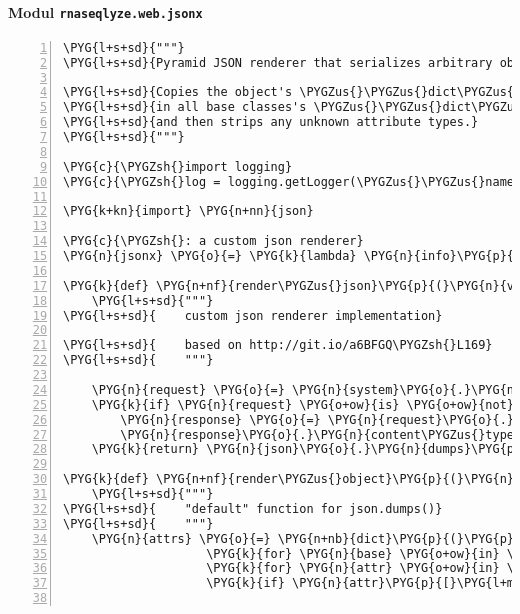 \paragraph{Modul \texttt{rnaseqlyze.web.jsonx}}
\label{rnaseqlyze-pdf:modul-rnaseqlyze-web-jsonx}
\begin{Verbatim}[commandchars=\\\{\},numbers=left,firstnumber=1,stepnumber=5]
\PYG{l+s+sd}{"""}
\PYG{l+s+sd}{Pyramid JSON renderer that serializes arbitrary objects}

\PYG{l+s+sd}{Copies the object's \PYGZus{}\PYGZus{}dict\PYGZus{}\PYGZus{}, looks up all attrs}
\PYG{l+s+sd}{in all base classes's \PYGZus{}\PYGZus{}dict\PYGZus{}\PYGZus{}'s on the object}
\PYG{l+s+sd}{and then strips any unknown attribute types.}
\PYG{l+s+sd}{"""}

\PYG{c}{\PYGZsh{}import logging}
\PYG{c}{\PYGZsh{}log = logging.getLogger(\PYGZus{}\PYGZus{}name\PYGZus{}\PYGZus{})}

\PYG{k+kn}{import} \PYG{n+nn}{json}

\PYG{c}{\PYGZsh{}: a custom json renderer}
\PYG{n}{jsonx} \PYG{o}{=} \PYG{k}{lambda} \PYG{n}{info}\PYG{p}{:} \PYG{n}{render\PYGZus{}json}

\PYG{k}{def} \PYG{n+nf}{render\PYGZus{}json}\PYG{p}{(}\PYG{n}{value}\PYG{p}{,} \PYG{n}{system}\PYG{p}{)}\PYG{p}{:}
    \PYG{l+s+sd}{"""}
\PYG{l+s+sd}{    custom json renderer implementation}

\PYG{l+s+sd}{    based on http://git.io/a6BFGQ\PYGZsh{}L169}
\PYG{l+s+sd}{    """}

    \PYG{n}{request} \PYG{o}{=} \PYG{n}{system}\PYG{o}{.}\PYG{n}{get}\PYG{p}{(}\PYG{l+s}{'}\PYG{l+s}{request}\PYG{l+s}{'}\PYG{p}{)}
    \PYG{k}{if} \PYG{n}{request} \PYG{o+ow}{is} \PYG{o+ow}{not} \PYG{n+nb+bp}{None}\PYG{p}{:}
        \PYG{n}{response} \PYG{o}{=} \PYG{n}{request}\PYG{o}{.}\PYG{n}{response}
        \PYG{n}{response}\PYG{o}{.}\PYG{n}{content\PYGZus{}type} \PYG{o}{=} \PYG{l+s}{'}\PYG{l+s}{application/json}\PYG{l+s}{'}
    \PYG{k}{return} \PYG{n}{json}\PYG{o}{.}\PYG{n}{dumps}\PYG{p}{(}\PYG{n}{value}\PYG{p}{,} \PYG{n}{default}\PYG{o}{=}\PYG{n}{render\PYGZus{}object}\PYG{p}{,} \PYG{n}{indent}\PYG{o}{=}\PYG{l+m+mi}{4}\PYG{p}{)}

\PYG{k}{def} \PYG{n+nf}{render\PYGZus{}object}\PYG{p}{(}\PYG{n}{obj}\PYG{p}{)}\PYG{p}{:}
    \PYG{l+s+sd}{"""}
\PYG{l+s+sd}{    "default" function for json.dumps()}
\PYG{l+s+sd}{    """}
    \PYG{n}{attrs} \PYG{o}{=} \PYG{n+nb}{dict}\PYG{p}{(}\PYG{p}{(}\PYG{n}{attr}\PYG{p}{,} \PYG{n+nb}{getattr}\PYG{p}{(}\PYG{n}{obj}\PYG{p}{,} \PYG{n}{attr}\PYG{p}{)}\PYG{p}{)}
                    \PYG{k}{for} \PYG{n}{base} \PYG{o+ow}{in} \PYG{n}{obj}\PYG{o}{.}\PYG{n}{\PYGZus{}\PYGZus{}class\PYGZus{}\PYGZus{}}\PYG{o}{.}\PYG{n}{\PYGZus{}\PYGZus{}mro\PYGZus{}\PYGZus{}}
                    \PYG{k}{for} \PYG{n}{attr} \PYG{o+ow}{in} \PYG{n}{base}\PYG{o}{.}\PYG{n}{\PYGZus{}\PYGZus{}dict\PYGZus{}\PYGZus{}}
                    \PYG{k}{if} \PYG{n}{attr}\PYG{p}{[}\PYG{l+m+mi}{0}\PYG{p}{]} \PYG{o}{!=} \PYG{l+s}{'}\PYG{l+s}{\PYGZus{}}\PYG{l+s}{'}\PYG{p}{)}


\end{Verbatim}
